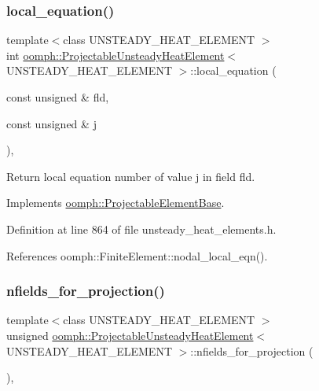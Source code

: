 \subsubsection{\texorpdfstring{local\+\_\+equation()}{local\_equation()}}
{\footnotesize\ttfamily template$<$class U\+N\+S\+T\+E\+A\+D\+Y\+\_\+\+H\+E\+A\+T\+\_\+\+E\+L\+E\+M\+E\+NT $>$ \\
int \hyperlink{classoomph_1_1ProjectableUnsteadyHeatElement}{oomph\+::\+Projectable\+Unsteady\+Heat\+Element}$<$ U\+N\+S\+T\+E\+A\+D\+Y\+\_\+\+H\+E\+A\+T\+\_\+\+E\+L\+E\+M\+E\+NT $>$\+::local\+\_\+equation (\begin{DoxyParamCaption}\item[{const unsigned \&}]{fld,  }\item[{const unsigned \&}]{j }\end{DoxyParamCaption})\hspace{0.3cm}{\ttfamily [inline]}, {\ttfamily [virtual]}}



Return local equation number of value j in field fld. 



Implements \hyperlink{classoomph_1_1ProjectableElementBase_ac5c27ae929ff636dc7747fe23fd4f738}{oomph\+::\+Projectable\+Element\+Base}.



Definition at line 864 of file unsteady\+\_\+heat\+\_\+elements.\+h.



References oomph\+::\+Finite\+Element\+::nodal\+\_\+local\+\_\+eqn().

\mbox{\label{classoomph_1_1ProjectableUnsteadyHeatElement_a8966da6a379eb20fcf86efe03c681a86}} 
\subsubsection{\texorpdfstring{nfields\+\_\+for\+\_\+projection()}{nfields\_for\_projection()}}
{\footnotesize\ttfamily template$<$class U\+N\+S\+T\+E\+A\+D\+Y\+\_\+\+H\+E\+A\+T\+\_\+\+E\+L\+E\+M\+E\+NT $>$ \\
unsigned \hyperlink{classoomph_1_1ProjectableUnsteadyHeatElement}{oomph\+::\+Projectable\+Unsteady\+Heat\+Element}$<$ U\+N\+S\+T\+E\+A\+D\+Y\+\_\+\+H\+E\+A\+T\+\_\+\+E\+L\+E\+M\+E\+NT $>$\+::nfields\+\_\+for\+\_\+projection (\begin{DoxyParamCaption}{ }\end{DoxyParamCaption})\hspace{0.3cm}{\ttfamily [inline]}, {\ttfamily [virtual]}}



